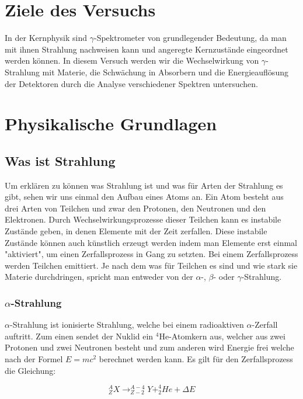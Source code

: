 \section{Ziele des Versuchs}

In der Kernphysik sind $\gamma$-Spektrometer von grundlegender Bedeutung, da man mit ihnen Strahlung nachweisen kann und angeregte Kernzustände eingeordnet werden können. In diesem Versuch werden wir die Wechselwirkung von $\gamma$-Strahlung mit Materie, die Schwächung in Absorbern und die Energieauflösung der Detektoren durch die Analyse verschiedener Spektren untersuchen.

\section{Physikalische Grundlagen}

\subsection{Was ist Strahlung}
Um erklären zu können was Strahlung ist und was für Arten der Strahlung es gibt, sehen wir uns einmal den Aufbau eines Atoms an. Ein Atom besteht aus drei Arten von Teilchen und zwar den Protonen, den Neutronen und den Elektronen. Durch Wechselwirkungsprozesse dieser Teilchen kann es instabile Zustände geben, in denen Elemente mit der Zeit zerfallen. Diese instabile Zustände können auch künstlich erzeugt werden indem man  Elemente erst einmal "aktiviert", um einen Zerfallsprozess in Gang zu setzten. Bei einem Zerfallsprozess werden Teilchen emittiert. Je nach dem was für Teilchen es sind und wie stark sie Materie durchdringen, spricht man entweder von der $\alpha$-, $\beta$- oder $\gamma$-Strahlung. 

\subsubsection*{$\alpha$-Strahlung}
$\alpha$-Strahlung ist ionisierte Strahlung, welche bei einem radioaktiven $\alpha$-Zerfall auftritt. Zum einen sendet der Nuklid ein $^{4}$He-Atomkern aus, welcher aus zwei Protonen und zwei Neutronen besteht und zum anderen wird Energie frei welche nach der Formel $E=mc^{2}$ berechnet werden kann. Es gilt für den Zerfallsprozess die Gleichung:

\begin{equation}
^{A}_{Z}X \rightarrow ^{A-4}_{Z-2}Y + ^{4}_{2}He + \Delta E 
\end{equation}

